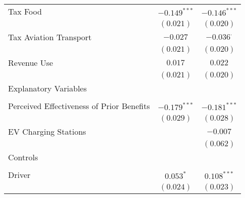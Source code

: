 \begin{center}
\begin{tiny}
\begin{longtable}{l@{} c@{} c@{}}
\quad Tax Food                                                                             & $-0.149^{***}$   & $-0.146^{***}$   \\
                                                                                           & $(0.021)$        & $(0.020)$        \\
\quad Tax Aviation Transport                                                               & $-0.027$         & $-0.036^{\cdot}$ \\
                                                                                           & $(0.021)$        & $(0.020)$        \\
\quad Revenue Use                                                                          & $0.017$          & $0.022$          \\
                                                                                           & $(0.021)$        & $(0.020)$        \\
Explanatory Variables                                                                      &                  &                  \\
                                                                                           &                  &                  \\
\quad Perceived Effectiveness of Prior Benefits                                            & $-0.179^{***}$   & $-0.181^{***}$   \\
                                                                                           & $(0.029)$        & $(0.028)$        \\
\quad EV Charging Stations                                                                 &                  & $-0.007$         \\
                                                                                           &                  & $(0.062)$        \\
Controls                                                                                   &                  &                  \\
                                                                                           &                  &                  \\
\quad Driver                                                                               & $0.053^{*}$      & $0.108^{***}$    \\
                                                                                           & $(0.024)$        & $(0.023)$        \\

\end{longtable}
\end{tiny}
\end{center}
